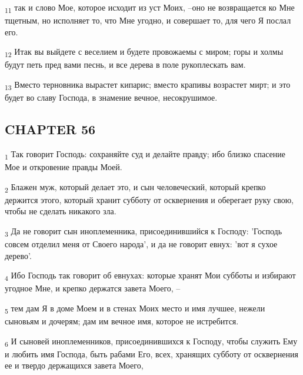 \begin{tcolorbox}
\textsubscript{11} так и слово Мое, которое исходит из уст Моих, --оно не возвращается ко Мне тщетным, но исполняет то, что Мне угодно, и совершает то, для чего Я послал его.
\end{tcolorbox}
\begin{tcolorbox}
\textsubscript{12} Итак вы выйдете с веселием и будете провожаемы с миром; горы и холмы будут петь пред вами песнь, и все дерева в поле рукоплескать вам.
\end{tcolorbox}
\begin{tcolorbox}
\textsubscript{13} Вместо терновника вырастет кипарис; вместо крапивы возрастет мирт; и это будет во славу Господа, в знамение вечное, несокрушимое.
\end{tcolorbox}
\subsection{CHAPTER 56}
\begin{tcolorbox}
\textsubscript{1} Так говорит Господь: сохраняйте суд и делайте правду; ибо близко спасение Мое и откровение правды Моей.
\end{tcolorbox}
\begin{tcolorbox}
\textsubscript{2} Блажен муж, который делает это, и сын человеческий, который крепко держится этого, который хранит субботу от осквернения и оберегает руку свою, чтобы не сделать никакого зла.
\end{tcolorbox}
\begin{tcolorbox}
\textsubscript{3} Да не говорит сын иноплеменника, присоединившийся к Господу: 'Господь совсем отделил меня от Своего народа', и да не говорит евнух: 'вот я сухое дерево'.
\end{tcolorbox}
\begin{tcolorbox}
\textsubscript{4} Ибо Господь так говорит об евнухах: которые хранят Мои субботы и избирают угодное Мне, и крепко держатся завета Моего, --
\end{tcolorbox}
\begin{tcolorbox}
\textsubscript{5} тем дам Я в доме Моем и в стенах Моих место и имя лучшее, нежели сыновьям и дочерям; дам им вечное имя, которое не истребится.
\end{tcolorbox}
\begin{tcolorbox}
\textsubscript{6} И сыновей иноплеменников, присоединившихся к Господу, чтобы служить Ему и любить имя Господа, быть рабами Его, всех, хранящих субботу от осквернения ее и твердо держащихся завета Моего,
\end{tcolorbox}
